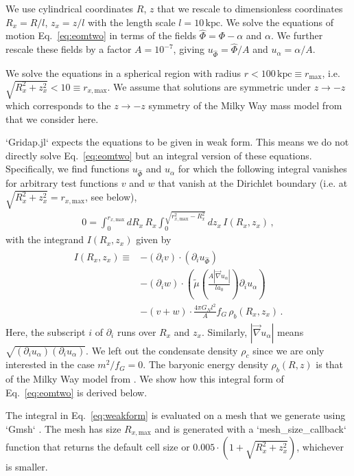 \documentclass[reprint, amsmath,amssymb, nofootinbib, aps, prd]{revtex4-2}
\begin{document}
We use cylindrical coordinates $R$, $z$ that we rescale to dimensionless coordinates $R_x = R/l$, $z_x = z/l$ with the length scale $l = 10\,\mathrm{kpc}$.
We solve the equations of motion Eq.~\eqref{eq:eomtwo} in terms of the fields $\hat{\Phi} = \Phi - \alpha$ and $\alpha$.
We further rescale these fields by a factor $A = 10^{-7}$, giving $u_{\hat{\Phi}} = \hat{\Phi}/A$ and $u_\alpha = \alpha/A$.

We solve the equations in a spherical region with radius $r < 100\,\mathrm{kpc} \equiv r_{\mathrm{max}}$, i.e. $\sqrt{R_x^2+z_x^2} < 10 \equiv r_{x,\mathrm{max}}$.
We assume that solutions are symmetric under $z \to -z$ which corresponds to the $z \to -z$ symmetry of the Milky Way mass model from \cite{McGaugh2019b} that we consider here.

`Gridap.jl` expects the equations to be given in weak form.
This means we do not directly solve Eq.~\eqref{eq:eomtwo} but an integral version of these equations.
Specifically, we find functions $u_{\hat{\Phi}}$ and $u_\alpha$ for which the following integral vanishes for arbitrary test functions $v$ and $w$ that vanish at the Dirichlet boundary (i.e. at $\sqrt{R_x^2 +z_x^2} = r_{x,\mathrm{max}}$, see below),
\begin{align}
\label{eq:weakform}
 0 = \int_0^{r_{x,\mathrm{max}}} dR_x \, R_x \int_0^{\sqrt{r_{x,\mathrm{max}}^2 - R_x^2}} dz_x \, I(R_x, z_x)\,,
\end{align}
with the integrand $I(R_x, z_x)$ given by
\begin{align}
\begin{split}
 I(R_x, z_x) \equiv
 &- (\partial_i v) \cdot (\partial_i u_{\hat{\Phi}}) \\
 &- (\partial_i w) \cdot \left( \tilde{\mu}\left(\frac{A |\vec{\nabla} u_\alpha|}{l a_0}\right) \partial_i u_\alpha \right) \\
 &- (v+w) \cdot \frac{4 \pi G_N l^2}{A} f_G \, \rho_b(R_x, z_x)
  \,.
\end{split}
\end{align}
Here, the subscript $i$ of $\partial_i$ runs over $R_x$ and $z_x$.
Similarly, $|\vec{\nabla} u_\alpha|$ means $\sqrt{(\partial_i u_\alpha) (\partial_i u_\alpha)}$.
We left out the condensate density $\rho_c$ since we are only interested in the case $m^2/f_G = 0$.
The baryonic energy density $\rho_b(R,z)$ is that of the Milky Way model from \cite{McGaugh2019b}.
We show how this integral form of Eq.~\eqref{eq:eomtwo} is derived below.

The integral in Eq.~\eqref{eq:weakform} is evaluated on a mesh that we generate using `Gmsh` \citep{Geuzaine2009}.
The mesh has size $R_{x,\mathrm{max}}$ and is generated with a `mesh\_size\_callback` function that returns the default cell size or $0.005 \cdot (1 + \sqrt{R_x^2 + z_x^2})$, whichever is smaller.
\end{document}
